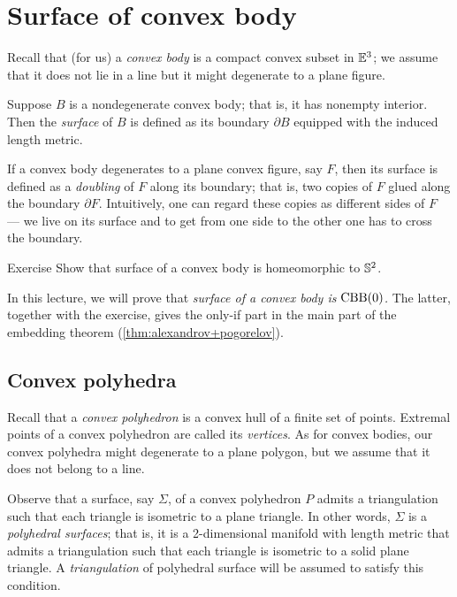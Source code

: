 \chapter{Surface of convex body}

Recall that (for us) a \emph{convex body} is a compact convex subset in $\mathbb{E}^3$;
we assume that it does not lie in a line but it might degenerate to a plane figure.

Suppose $B$ is a nondegenerate convex body; that is, it has nonempty interior.
Then the \emph{surface} of $B$ is defined as its boundary $\partial B$ equipped with the induced length metric.

If a convex body degenerates to a plane convex figure, say $F$, then its surface is defined as a \emph{doubling} of $F$ along its boundary;
that is, two copies of $F$ glued along the boundary $\partial F$.
Intuitively, one can regard these copies as different sides of $F$ --- we live on its surface and to get from one side to the other one has to cross the boundary.

\begin{thm}{Exercise}\label{ex:surf-S2}
Show that surface of a convex body is homeomorphic to $\mathbb{S}^2$.
\end{thm}

In this lecture, we will prove that \textit{surface of a convex body is $\mathrm{CBB}(0)$.}
The latter, together with the exercise, gives the only-if part in the main part of the embedding theorem (\ref{thm:alexandrov+pogorelov}). 



\section{Convex polyhedra}

Recall that a \emph{convex polyhedron} is a convex hull of a finite set of points.
Extremal points of a convex polyhedron are called its \emph{vertices}.
As for convex bodies, our convex polyhedra might degenerate to a plane polygon, but we assume that it does not belong to a line.

Observe that a surface, say $\Sigma$, of a convex polyhedron $P$ admits a triangulation such that each triangle is isometric to a plane triangle.
In other words, $\Sigma$ is a \emph{polyhedral surfaces};
that is, it is a 2-dimensional manifold with length metric that admits a triangulation such that each triangle is isometric to a solid plane triangle.
A \emph{triangulation} of polyhedral surface will be assumed to satisfy this condition.

